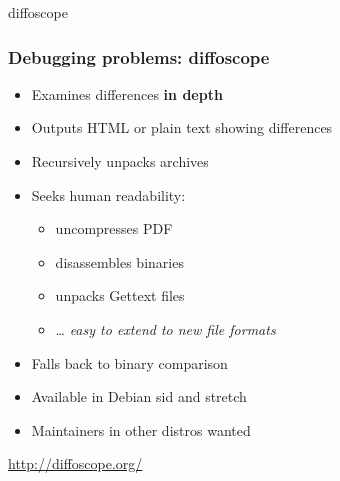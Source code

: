 \documentclass[14pt,aspectratio=169]{beamer}
\begin{document}
{
\begin{frame}{diffoscope}
 \frametitle{Debugging problems: diffoscope}

 \begin{itemize}
  \item Examines differences \textbf{in depth}
  \item Outputs HTML or plain text showing differences
  \item Recursively unpacks archives
  \item Seeks human readability:
   \begin{itemize}
    \item uncompresses PDF
    \item disassembles binaries
    \item unpacks Gettext files
    \item … \textit{easy to extend to new file formats}
   \end{itemize}
  \item Falls back to binary comparison
  \item Available in Debian sid and stretch
  \item Maintainers in other distros wanted
 \end{itemize}
 \vfill
 \begin{center}
  \url{http://diffoscope.org/}\\
  {\footnotesize {}}
 \end{center}
\end{frame}
}
\end{document}

